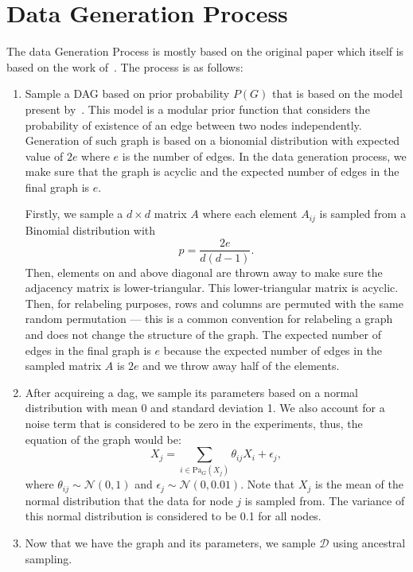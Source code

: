 \documentclass{lxaiproposal}
\begin{document}
    \section{Data Generation Process}\label{app:data_generation}
    \vspace*{-3mm}

    The data Generation Process is mostly based on the original paper which itself is based on the work of~\cite{erdos1960evolutionrandomgraphs}.
    The process is as follows:

    \begin{enumerate}
        \item Sample a DAG based on prior probability $P(G)$ that is based on the model present by~\cite{erdos1960evolutionrandomgraphs}.
        This model is a modular prior function that considers the probability of existence of an edge between two
        nodes independently. Generation of such graph is based on a bionomial distribution with expected value of $2e$
        where $e$ is the number of edges. In the data generation process, we make sure that the graph is acyclic and
        the expected number of edges in the final graph is $e$.

        Firstly, we sample a $d \times d$ matrix $A$ where each element $A_{ij}$ is sampled from a Binomial
        distribution with
        \begin{equation}
            p = \frac{2e}{d(d-1)}.
            \label{eq:binomial}
        \end{equation}
        Then, elements on and above diagonal are thrown away to make sure the adjacency matrix is lower-triangular.
        This lower-triangular matrix is acyclic. Then, for relabeling purposes, rows and columns are permuted with
        the same random permutation --- this is a common convention for relabeling a graph and does not change the
        structure of the graph.
        The expected number of edges in the final graph is $e$ because the expected number of edges in the sampled
        matrix $A$ is $2e$ and we throw away half of the elements.

        \item After acquireing a dag, we sample its parameters
        based on a normal distribution with mean 0 and standard deviation 1. We also account for a noise term that
        is considered to be zero in the experiments, thus, the equation of the graph would be:
        \begin{equation}
            X_j = \sum_{i \in \text{Pa}_G(X_j)} \theta_{ij}X_i + \epsilon_j,
            \label{eq:graph}
        \end{equation}
        where $\theta_{ij} \sim \mathcal{N}(0, 1)$ and $\epsilon_j \sim \mathcal{N}(0, 0.01)$. Note that $X_j$ is the
        mean of the normal distribution that the data for node $j$ is sampled from. The variance of this normal
        distribution is considered to be 0.1 for all nodes.

        \item Now that we have the graph and its parameters, we sample $\mathcal{D}$ using ancestral sampling.
    \end{enumerate}
\end{document}
